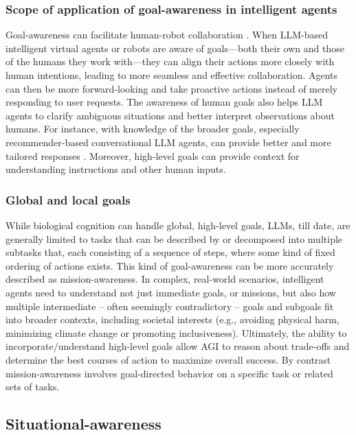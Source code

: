 \documentclass[10pt,journal,compsoc]{IEEEtran}
\begin{document}
	\subsubsection{Scope of application of goal-awareness in intelligent agents}
	Goal-awareness can facilitate human-robot collaboration \cite{chen2017guest,deng2023goal,chen2012situation}. When LLM-based intelligent virtual agents or robots are aware of goals—both their own and those of the humans they work with—they can align their actions more closely with human intentions, leading to more seamless and effective collaboration. Agents can then be more forward-looking and take proactive actions \cite{deng2023goal} instead of merely responding to user requests. The awareness of human goals also helps LLM agents to clarify ambiguous situations and better interpret observations about humans.  For instance, with knowledge of the broader goals, especially recommender-based conversational LLM agents, can provide better and more tailored responses \cite{wang2024improving}.  Moreover, high-level goals can provide context for understanding instructions and other human inputs.
	
	\subsubsection{Global and local goals}
	While biological cognition can handle global, high-level goals, LLMs, till date, are generally limited to tasks that can be described by or decomposed into multiple subtasks that, each consisting of a sequence of steps, where some kind of fixed ordering of actions exists. This kind of goal-awareness can be more accurately described as mission-awareness. In complex, real-world scenarios, intelligent agents need to understand not just immediate goals, or missions, but also how multiple intermediate – often seemingly contradictory – goals and subgoals fit into broader contexts, including societal interests (e.g., avoiding physical harm, minimizing climate change or promoting inclusiveness). Ultimately, the ability to incorporate/understand high-level goals allow AGI to reason about trade-offs and determine the best courses of action to maximize overall success.  By contrast mission-awareness involves goal-directed behavior on a specific task or related sets of tasks. 
	
	
	
	\subsection{Situational-awareness}
	
\end{document}
